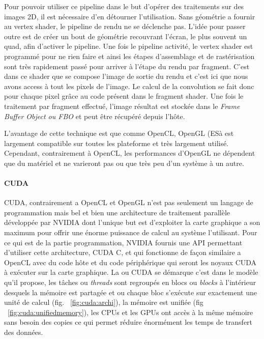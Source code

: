 Pour pouvoir utiliser ce pipeline dans le but d'opérer des traitements sur des images 2D, il est nécessaire d'en détourner l'utilisation. Sans géométrie a fournir au vertex shader, le pipeline de rendu ne se déclenche pas. L'idée pour passer outre est de créer un bout de géométrie recouvrant l'écran, le plus souvent un quad, afin d'activer le pipeline. Une fois le pipeline activité, le vertex shader est programmé pour ne rien faire  et ainsi les étapes d'assemblage et de rastérisation sont très rapidement passé pour arriver à l'étape du rendu par fragment. C'est dans ce shader que se compose l'image de sortie du rendu et c'est ici que nous avons access à tout les pixels de l'image. Le calcul de la convolution se fait donc pour chaque pixel grâce au code présent dans le fragment shader. Une fois le traitement par fragment effectué, l'image résultat est stockée dans le \emph{Frame Buffer Object ou FBO} et peut être récupéré depuis l'hôte.

L'avantage de cette technique est que comme OpenCL, OpenGL (ESà est largement compatible sur toutes les plateforme et très largement utilisé. Cependant, contrairement à OpenCL, les performances d'OpenGL ne dépendent que du matériel et ne varieront pas ou que très peu d'un système à un autre.

\paragraph{CUDA} CUDA, contrairement a OpenCL et OpenGL n'est pas seulement un langage de programmation mais bel et bien une architecture de traitement parallèle développée par NVIDIA dont l'unique but est d'exploiter la carte graphique a son maximum pour offrir une énorme puissance de calcul au système l'utilisant. Pour ce qui est de la partie programmation, NVIDIA fournis une API permettant d'utiliser cette architecture, CUDA C, et qui fonctionne de façon similaire a OpenCL avec du code hôte et du code périphérique qui seront les noyaux CUDA à exécuter sur la carte graphique. La ou CUDA se démarque c'est dans le modèle qu'il propose, les tâches ou \emph{threads} sont regroupés en blocs ou \emph{blocks} à l'intérieur desquels la mémoire est partagée et ou chaque bloc s'exécute sur exactement une unité de calcul (fig. ~\ref{fig:cuda:archi}), la mémoire est unifiée (fig ~\ref{fig:cuda:unifiedmemory}), les CPUs et les GPUs ont accès à la même mémoire sans besoin des copies ce qui permet réduire énormément les temps de transfert des données.

